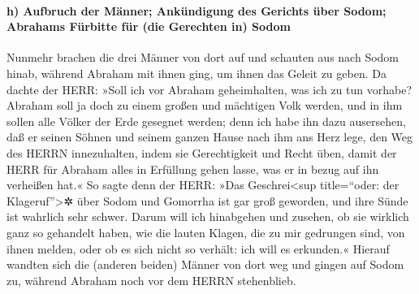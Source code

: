 \hypertarget{h-aufbruch-der-muxe4nner-ankuxfcndigung-des-gerichts-uxfcber-sodom-abrahams-fuxfcrbitte-fuxfcr-die-gerechten-in-sodom}{%
\paragraph{h) Aufbruch der Männer; Ankündigung des Gerichts über Sodom;
Abrahams Fürbitte für (die Gerechten in)
Sodom}\label{h-aufbruch-der-muxe4nner-ankuxfcndigung-des-gerichts-uxfcber-sodom-abrahams-fuxfcrbitte-fuxfcr-die-gerechten-in-sodom}}

 Nunmehr brachen die drei Männer von dort auf und
schauten aus nach Sodom hinab, während Abraham mit ihnen ging, um ihnen
das Geleit zu geben.  Da dachte der HERR: »Soll ich vor
Abraham geheimhalten, was ich zu tun vorhabe?  Abraham
soll ja doch zu einem großen und mächtigen Volk werden, und in ihm
sollen alle Völker der Erde gesegnet werden;  denn ich
habe ihn dazu ausersehen, daß er seinen Söhnen und seinem ganzen Hause
nach ihm ans Herz lege, den Weg des HERRN innezuhalten, indem sie
Gerechtigkeit und Recht üben, damit der HERR für Abraham alles in
Erfüllung gehen lasse, was er in bezug auf ihn verheißen hat.«
 So sagte denn der HERR: »Das Geschrei\textless sup
title=``oder: der Klageruf''\textgreater✲ über Sodom und Gomorrha ist
gar groß geworden, und ihre Sünde ist wahrlich sehr schwer.
 Darum will ich hinabgehen und zusehen, ob sie wirklich
ganz so gehandelt haben, wie die lauten Klagen, die zu mir gedrungen
sind, von ihnen melden, oder ob es sich nicht so verhält: ich will es
erkunden.«  Hierauf wandten sich die (anderen beiden)
Männer von dort weg und gingen auf Sodom zu, während Abraham noch vor
dem HERRN stehenblieb.

